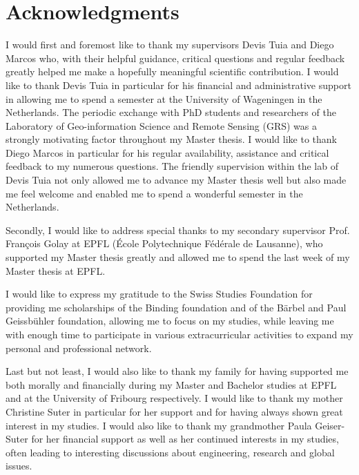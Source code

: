 \documentclass[10pt]{article}
\begin{document}
\thispagestyle{empty}
\section*{Acknowledgments}
I would first and foremost like to thank my supervisors Devis Tuia and Diego Marcos who, with their helpful guidance, critical questions and regular feedback greatly helped me make a hopefully meaningful scientific contribution. I would like to thank Devis Tuia in particular for his financial and administrative support in allowing me to spend a semester at the University of Wageningen in the Netherlands. The periodic exchange with PhD students and researchers of the Laboratory of Geo-information Science and Remote Sensing (GRS) was a strongly motivating factor throughout my Master thesis. I would like to thank Diego Marcos in particular for his regular availability, assistance and critical feedback to my numerous questions. The friendly supervision within the lab of Devis Tuia not only allowed me to advance my Master thesis well but also made me feel welcome and enabled me to spend a wonderful semester in the Netherlands.

Secondly, I would like to address special thanks to my secondary supervisor Prof. François Golay at EPFL (École Polytechnique Fédérale de Lausanne), who supported my Master thesis greatly and allowed me to spend the last week of my Master thesis at EPFL.

I would like to express my gratitude to the Swiss Studies Foundation for providing me scholarships of the Binding foundation and of the Bärbel and Paul Geissbühler foundation, allowing me to focus on my studies, while leaving me with enough time to participate in various extracurricular activities to expand my personal and professional network.

Last but not least, I would also like to thank my family for having supported me both morally and financially during my Master and Bachelor studies at EPFL and at the University of Fribourg respectively. I would like to thank my mother Christine Suter in particular for her support and for having always shown great interest in my studies. I would also like to thank my grandmother Paula Geiser-Suter for her financial support as well as her continued interests in my studies, often leading to interesting discussions about engineering, research and global issues.

\newpage
\glsunsetall
{}
\tableofcontents
{}
\listoffigures
{}
\listoftables
\glsresetall
\clearpage
\printglossaries
\clearpage
\end{document}
